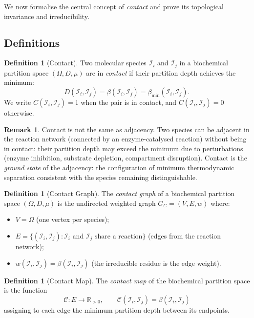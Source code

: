\documentclass[11pt,twocolumn]{article}
\theoremstyle{plain}
\theoremstyle{definition}
\newtheorem{definition}[theorem]{Definition}
\newtheorem{remark}[theorem]{Remark}
\newcommand{\CC}{\mathcal{C}}
\newcommand{\betamin}{\beta_{\min}}
\newcommand{\reals}{\mathbb{R}}
\begin{document}
We now formalise the central concept of \emph{contact} and prove its topological
invariance and irreducibility.

\subsection{Definitions}

\begin{definition}[Contact]
\label{def:contact}
Two molecular species $\mathcal{I}_i$ and $\mathcal{I}_j$ in a biochemical
partition space $(\Omega, D, \mu)$ are in \emph{contact} if their partition
depth achieves the minimum:
\[
  D(\mathcal{I}_i, \mathcal{I}_j)
  = \beta(\mathcal{I}_i, \mathcal{I}_j)
  = \betamin(\mathcal{I}_i, \mathcal{I}_j).
\]
We write $C(\mathcal{I}_i, \mathcal{I}_j) = 1$ when the pair is in contact,
and $C(\mathcal{I}_i, \mathcal{I}_j) = 0$ otherwise.
\end{definition}

\begin{remark}
Contact is not the same as adjacency. Two species can be adjacent in the
reaction network (connected by an enzyme-catalysed reaction) without being in
contact: their partition depth may exceed the minimum due to perturbations
(enzyme inhibition, substrate depletion, compartment disruption). Contact is
the \emph{ground state} of the adjacency: the configuration of minimum
thermodynamic separation consistent with the species remaining distinguishable.
\end{remark}

\begin{definition}[Contact Graph]
\label{def:contact_graph}
The \emph{contact graph} of a biochemical partition space $(\Omega, D, \mu)$
is the undirected weighted graph $G_C = (V, E, w)$ where:
\begin{itemize}
\item $V = \Omega$ (one vertex per species);
\item $E = \{(\mathcal{I}_i, \mathcal{I}_j) : \mathcal{I}_i \text{ and }
  \mathcal{I}_j \text{ share a reaction}\}$ (edges from the reaction network);
\item $w(\mathcal{I}_i, \mathcal{I}_j) = \beta(\mathcal{I}_i, \mathcal{I}_j)$
  (the irreducible residue is the edge weight).
\end{itemize}
\end{definition}

\begin{definition}[Contact Map]
\label{def:contact_map}
The \emph{contact map} of the biochemical partition space is the function
\[
  \CC: E \to \reals_{>0}, \qquad
  \CC(\mathcal{I}_i, \mathcal{I}_j) = \beta(\mathcal{I}_i, \mathcal{I}_j)
\]
assigning to each edge the minimum partition depth between its endpoints.
\end{definition}
\end{document}
